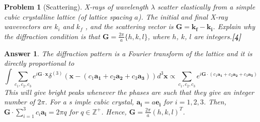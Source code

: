 \documentclass[a4paper]{article}
\newtheorem{ans}{Answer}[subsection]
\theoremstyle{new}
\newtheorem{qns}{Problem}[subsection]
\begin{document}
\begin{qns}[Scattering]
X-rays of wavelength $\lambda$ scatter elastically from a simple cubic crystalline lattice (of lattice spacing $a$). The initial and final X-ray wavevectors are $k_i$ and $k_f$ , and the scattering vector is $\mathbf{G}=\mathbf{k_f}-\mathbf{k_i}$.  Explain why the diffraction condition is that $\mathbf{G}=\frac{2\pi}{a}\{h,k,l\}$, where $h$, $k$, $l$ are integers.\hfill\textbf{[4]}
\end{qns}
\begin{ans}
The diffraction pattern is a Fourier transform of the lattice and it is directly proportional to
$$\int\sum_{c_1,c_2,c_3}e^{i\mathbf{G}\cdot\mathbf{x}}\delta^{(3)}(\mathbf{x}-(c_1\mathbf{a_1}+c_2\mathbf{a_2}+c_3\mathbf{a_3}))d^3\mathbf{x}\propto\sum_{c_1,c_2,c_3}e^{i\mathbf{G}\cdot(c_1\mathbf{a_1}+c_2\mathbf{a_2}+c_3\mathbf{a_3})}$$
This will give bright peaks whenever the phases are such that they give an integer number of $2\pi$. For a s imple cubic crystal, $\mathbf{a_i}=a\mathbf{e_i}$ for $i=1,2,3$. Then, $\mathbf{G}\cdot\sum_{i=1}^3c_i\mathbf{a_i}=2\pi q$ for $q\in\mathbb{Z}^+$. Hence, $\mathbf{G}=\frac{2\pi}{a}(h,k,l)^T$.
\end{ans}
\newpage
\end{document}
